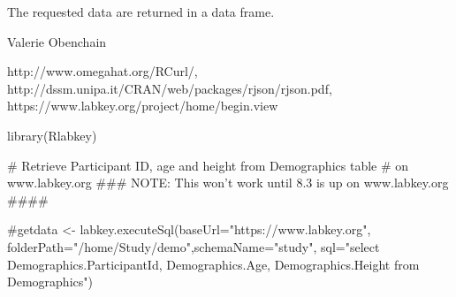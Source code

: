 \begin{Value}
The requested data are returned in a data frame.
\end{Value}
\begin{Author}\relax
Valerie Obenchain
\end{Author}
\begin{References}\relax
http://www.omegahat.org/RCurl/, 
http://dssm.unipa.it/CRAN/web/packages/rjson/rjson.pdf,
https://www.labkey.org/project/home/begin.view
\end{References}
\begin{SeeAlso}\relax
{}
\end{SeeAlso}
\begin{Examples}
\begin{ExampleCode}

library(Rlabkey)

# Retrieve Participant ID, age and height from Demographics table
# on www.labkey.org
### NOTE: This won't work until 8.3 is up on www.labkey.org ####

#getdata <- labkey.executeSql(baseUrl="https://www.labkey.org", folderPath="/home/Study/demo",schemaName="study", sql="select Demographics.ParticipantId, Demographics.Age, Demographics.Height from Demographics")

\end{ExampleCode}
\end{Examples}

